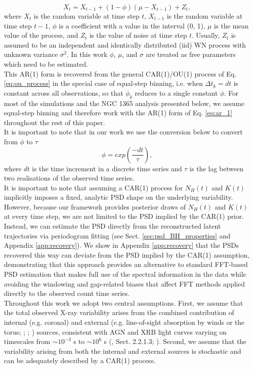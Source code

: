 \documentclass{aa}
\begin{document}
\begin{equation}
X_t = X_{t - 1} + (1 - \phi)(\mu - X_{t - 1}) + Z_t,
\label{eq:ar_1}
\end{equation}
where $X_t$ is the random variable at time step $t$, $X_{t - 1}$ is the random variable at time step
$t - 1$, $\phi$ is a coefficient with a value in the interval (0, 1), $\mu$ is the mean value of the
process, and $Z_t$ is the value of noise at time step $t$. Usually, $Z_t$ is assumed to be an independent
and identically distributed (iid) WN process with unknown variance $\sigma^2$. In this work $\phi$,
$\mu$, and $\sigma$ are treated as free parameters which need to be estimated. \\
This AR(1) form is recovered from the general CAR(1)/OU(1) process of Eq. \ref{eq:ou_process} in the
special case of equal-step binning, i.e. when $\Delta t_k = dt$ is constant across all observations, so
that $\phi_k$ reduces to a single constant $\phi$. For most of the simulations and the NGC 1365 analysis
presented below, we assume equal-step binning and therefore work with the AR(1) form of Eq.
\ref{eq:ar_1} throughout the rest of this paper. \\
It is important to note that in our work we use the conversion below to convert from $\phi$ to $\tau$
\begin{equation}
\phi = exp(\frac{-dt}{\tau}),
\label{eq:tau_to_phi}    
\end{equation}
where $dt$ is the time increment in a discrete time series and $\tau$ is the lag between two realisations
of the observed time series. \\
It is important to note that assuming a CAR(1) process for $N_H(t)$ and $K(t)$ implicitly imposes a
fixed, analytic PSD shape on the underlying variability. However, because our framework provides
posterior draws of $N_H(t)$ and $K(t)$ at every time step, we are not limited to the PSD implied by the
CAR(1) prior. Instead, we can estimate the PSD directly from the reconstructed latent trajectories via
periodogram fitting (see Sect. \ref{sec:psd_BH_properties} and Appendix \ref{app:recovery}). We show in
Appendix \ref{app:recovery} that the PSDs recovered this way can deviate from the PSD implied by the CAR(1) assumption,
demonstrating that this approach provides an alternative to standard FFT-based PSD estimation that makes
full use of the spectral information in the data while avoiding the windowing and gap-related biases
that affect FFT methods applied directly to the observed count time series. \\
Throughout this work we adopt two central assumptions. First, we assume that the total observed
X-ray variability arises from the combined contribution of internal (e.g. coronal) and external
(e.g. line-of-sight absorption by winds or the torus; \citealt{Maiolino2010}; \citealt{Mellah2020};
\citealt{Kretschmar2021}) sources, consistent with AGN and XRB light curves varying on timescales
from $\sim 10^{-3}$ s to $\sim 10^6$ s (\citealt{Laha2025}, Sect. 2.2.1.3; \citealt{Ricci2021}). Second,
we assume that the variability arising from both the internal and external sources is stochastic
and can be adequately described by a CAR(1) process. \\
\end{document}
